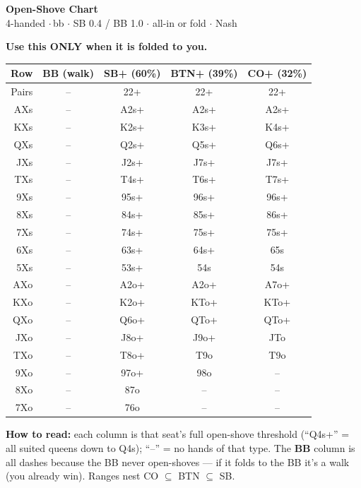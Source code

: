 \documentclass[11pt]{article}
\begin{document}
\begin{center}
{\LARGE\bfseries Open-Shove Chart}\\[2pt]
{\large 4-handed \;$\cdot$\,bb \;$\cdot$\; SB 0.4 / BB 1.0 \;$\cdot$\; all-in or fold \;$\cdot$\; Nash}
\end{center}
\noindent\textbf{Use this ONLY when it is folded to you.}\\[-2pt]
\begin{center}\begin{tabular}{R c c c c}
\toprule
\textbf{Row} & \textbf{BB} (walk) & \textbf{SB+} (60\%) & \textbf{BTN+} (39\%) & \textbf{CO+} (32\%)\\
\midrule
Pairs & -- & 22+ & 22+ & 22+\\
\midrule
AXs & -- & A2s+ & A2s+ & A2s+\\
KXs & -- & K2s+ & K3s+ & K4s+\\
QXs & -- & Q2s+ & Q5s+ & Q6s+\\
JXs & -- & J2s+ & J7s+ & J7s+\\
TXs & -- & T4s+ & T6s+ & T7s+\\
9Xs & -- & 95s+ & 96s+ & 96s+\\
8Xs & -- & 84s+ & 85s+ & 86s+\\
7Xs & -- & 74s+ & 75s+ & 75s+\\
6Xs & -- & 63s+ & 64s+ & 65s\\
5Xs & -- & 53s+ & 54s & 54s\\
\midrule
AXo & -- & A2o+ & A2o+ & A7o+\\
KXo & -- & K2o+ & KTo+ & KTo+\\
QXo & -- & Q6o+ & QTo+ & QTo+\\
JXo & -- & J8o+ & J9o+ & JTo\\
TXo & -- & T8o+ & T9o & T9o\\
9Xo & -- & 97o+ & 98o & --\\
8Xo & -- & 87o & -- & --\\
7Xo & -- & 76o & -- & --\\
\bottomrule
\end{tabular}\end{center}
\noindent\textbf{How to read:} each column is that seat's full open-shove threshold
(``Q4s+'' = all suited queens down to Q4s); ``--'' = no hands of that type. The \textbf{BB}
column is all dashes because the BB never open-shoves --- if it folds to the BB it's a walk
(you already win). Ranges nest CO $\subseteq$ BTN $\subseteq$ SB.
\par\vspace{4pt}
\end{document}
